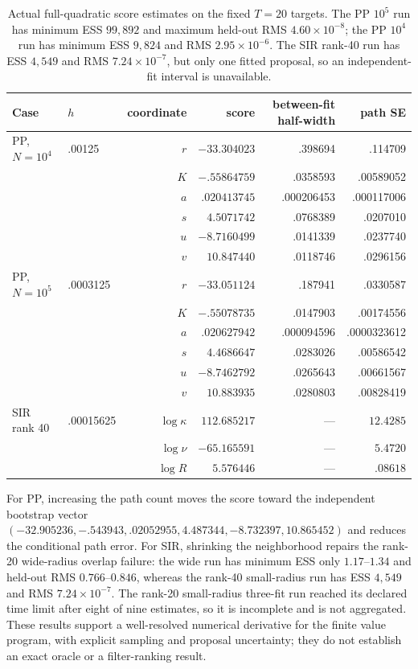 \begin{table}[htbp]
\centering
\scriptsize
\begin{tabular}{llrrrr}
\toprule
Case & $h$ & coordinate & score & between-fit half-width & path SE\\
\midrule
PP, $N=10^4$ & .00125 & $r$ & $-33.304023$ & .398694 & .114709\\
 & & $K$ & $-.55864759$ & .0358593 & .00589052\\
 & & $a$ & $.020413745$ & .000206453 & .000117006\\
 & & $s$ & $4.5071742$ & .0768389 & .0207010\\
 & & $u$ & $-8.7160499$ & .0141339 & .0237740\\
 & & $v$ & $10.847440$ & .0118746 & .0296156\\
\midrule
PP, $N=10^5$ & .0003125 & $r$ & $-33.051124$ & .187941 & .0330587\\
 & & $K$ & $-.55078735$ & .0147903 & .00174556\\
 & & $a$ & $.020627942$ & .000094596 & .0000323612\\
 & & $s$ & $4.4686647$ & .0283026 & .00586542\\
 & & $u$ & $-8.7462792$ & .0265643 & .00661567\\
 & & $v$ & $10.883935$ & .0280803 & .00828419\\
\midrule
SIR rank 40 & .00015625 & $\log\kappa$ & $112.685217$ & --- & $12.4285$\\
 & & $\log\nu$ & $-65.165591$ & --- & $5.4720$\\
 & & $\log R$ & $5.576446$ & --- & $.08618$\\
\bottomrule
\end{tabular}
\caption{Actual full-quadratic score estimates on the fixed $T=20$ targets.
The PP $10^5$ run has minimum ESS $99{,}892$ and maximum held-out RMS
$4.60\times10^{-8}$; the PP $10^4$ run has minimum ESS $9{,}824$ and RMS
$2.95\times10^{-6}$.  The SIR rank-40 run has ESS $4{,}549$ and RMS
$7.24\times10^{-7}$, but only one fitted proposal, so an independent-fit
interval is unavailable.}
\label{tab:bf-hd-final-score-values}
\end{table}

For PP, increasing the path count moves the score toward the independent
bootstrap vector
$(-32.905236,-.543943,.02052955,4.487344,-8.732397,10.865452)$ and reduces
the conditional path error.  For SIR, shrinking the neighborhood repairs the
rank-20 wide-radius overlap failure: the wide run has minimum ESS only
$1.17$--$1.34$ and held-out RMS $0.766$--$0.846$, whereas the rank-40
small-radius run has ESS $4{,}549$ and RMS $7.24\times10^{-7}$.  The rank-20
small-radius three-fit run reached its declared time limit after eight of nine
estimates, so it is incomplete and is not aggregated.  These results support a
well-resolved numerical derivative for the finite value program, with explicit
sampling and proposal uncertainty; they do not establish an exact oracle or a
filter-ranking result.


